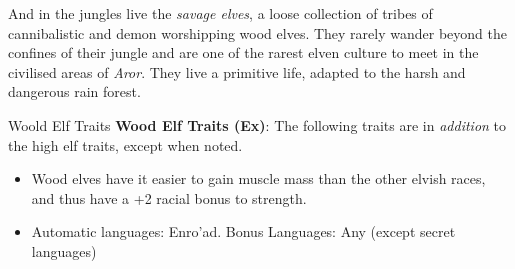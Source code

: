 And in the jungles  live the \emph{savage elves}, a loose
collection of tribes of cannibalistic and demon worshipping wood elves. They
rarely wander beyond the confines of their jungle and are one of the rarest
elven culture to meet in the civilised areas of \emph{Aror}. They live a
primitive life, adapted to the harsh and dangerous rain forest.

\begin{35e}{Woold Elf Traits}
  \textbf{Wood Elf Traits (Ex)}: The following traits are in \emph{addition}
  to the high elf traits, except when noted.
  \begin{itemize}[noitemsep]
    \item Wood elves have it easier to gain muscle mass than the other elvish
      races, and thus have a +2 racial bonus to strength.
    \item Automatic languages: Enro'ad. Bonus Languages: Any (except secret
      languages)
  \end{itemize}
\end{35e}
